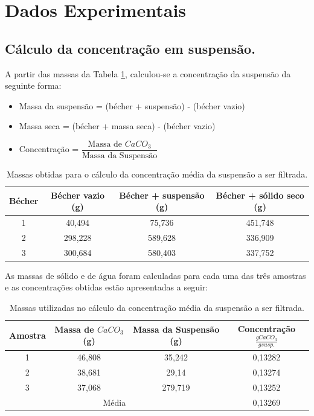 \section{Dados Experimentais}

\subsection{Cálculo da concentração em suspensão.}

A partir das massas da Tabela \ref{tab:massas}, calculou-se a concentração da suspensão da seguinte forma:

\begin{itemize}
	\item Massa da suspensão = (bécher + suspensão) - (bécher vazio)
	\item Massa seca = (bécher + massa seca) - (bécher vazio) 
	\item Concentração =  $\dfrac{\text{Massa de }CaCO_{3}}{\text{Massa da Suspensão}} $
\end{itemize}



\begin{table}[H]
	\centering
	\begin{tabular}{|c|c|c|c|}
		\hline
		\rowcolor[HTML]{DAE8FC} 
		\textbf{Bécher} & \textbf{Bécher vazio (g)} & \textbf{Bécher + suspensão (g)} & \textbf{Bécher  + sólido seco (g)} \\ \hline
		1 & 40,494 & 75,736 & 451,748 \\ \hline
		2 & 298,228 & 589,628 & 336,909 \\ \hline
		3 & 300,684 & 580,403 & 337,752 \\ \hline
	\end{tabular}
	\caption{Massas obtidas para o cálculo da concentração média da suspensão a ser filtrada.}
	\label{tab:massas}
\end{table}


As massas de sólido e de água foram calculadas para cada uma das três amostras e as concentrações obtidas estão apresentadas a seguir:

\begin{table}[H]
	\centering
	\begin{tabular}{|c|c|c|c|}
		\hline
		\rowcolor[HTML]{DAE8FC} 
		\textbf{Amostra} & \textbf{Massa de $CaCO_{3}$ (g)} & \textbf{Massa  da Suspensão (g)} & \textbf{Concentração $\frac{g CaCO_{3}}{g susp.}$} \\ \hline
		1 & 46,808 & 35,242 & 0,13282 \\ \hline
		2 & 38,681 & 29,14 & 0,13274 \\ \hline
		3 & 37,068 & 279,719 & 0,13252 \\ \hline
		\multicolumn{3}{|c|}{Média} & 0,13269 \\ \hline
	\end{tabular}
	\caption{Massas utilizadas no cálculo da concentração média da suspensão a ser filtrada.}
	\label{tab:massas2}
\end{table}

